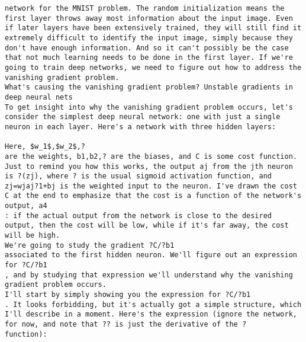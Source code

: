 \begin{lstlisting}
network for the MNIST problem. The random initialization means the first layer throws away most information about the input image. Even if later layers have been extensively trained, they will still find it extremely difficult to identify the input image, simply because they don't have enough information. And so it can't possibly be the case that not much learning needs to be done in the first layer. If we're going to train deep networks, we need to figure out how to address the vanishing gradient problem.
What's causing the vanishing gradient problem? Unstable gradients in deep neural nets
To get insight into why the vanishing gradient problem occurs, let's consider the simplest deep neural network: one with just a single neuron in each layer. Here's a network with three hidden layers: 

Here, $w_1$,$w_2$,?
are the weights, b1,b2,? are the biases, and C is some cost function. Just to remind you how this works, the output aj from the jth neuron is ?(zj), where ? is the usual sigmoid activation function, and zj=wjaj?1+bj is the weighted input to the neuron. I've drawn the cost C at the end to emphasize that the cost is a function of the network's output, a4
: if the actual output from the network is close to the desired output, then the cost will be low, while if it's far away, the cost will be high.
We're going to study the gradient ?C/?b1
associated to the first hidden neuron. We'll figure out an expression for ?C/?b1
, and by studying that expression we'll understand why the vanishing gradient problem occurs.
I'll start by simply showing you the expression for ?C/?b1
. It looks forbidding, but it's actually got a simple structure, which I'll describe in a moment. Here's the expression (ignore the network, for now, and note that ?? is just the derivative of the ?
function):


\end{lstlisting}
